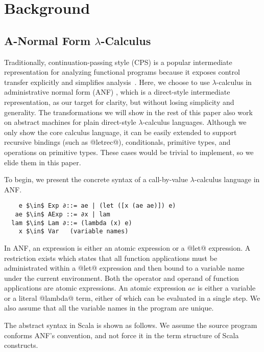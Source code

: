 \documentclass[acmsmall,review,anonymous]{acmart}\settopmatter{printfolios=true,printccs=false,printacmref=false}
\begin{document}
\section{Background} \label{background}

\subsection{A-Normal Form $\lambda$-Calculus} \label{anfsyntax}

Traditionally, continuation-passing style (CPS) is a popular intermediate representation
for analyzing functional programs because it exposes control transfer explicitly
and simplifies analysis~\cite{Shivers:1991:SSC:115865.115884, Shivers:1988:CFA:53990.54007}.
Here, we choose to use $\lambda$-calculus in administrative normal form (ANF) \cite{flanagan1993essence},
which is a direct-style intermediate representation, as our target for clarity,
but without losing simplicity and generality.
The transformations we will show in the rest of this paper
also work on abstract machines for plain direct-style $\lambda$-calculus languages.
Although we only show the core calculus language, it can be easily extended
to support recursive bindings (such as @letrec@), conditionals, primitive types, and
operations on primitive types. These cases would be trivial to implement,
so we elide them in this paper.

To begin, we present the concrete syntax of a call-by-value $\lambda$-calculus language
in ANF.

\begin{lstlisting}
    e $\in$ Exp ∂::= ae | (let ([x (ae ae)]) e)
   ae $\in$ AExp ::= ∂x | lam
  lam $\in$ Lam ∂::= (lambda (x) e)
    x $\in$ Var   (variable names)
\end{lstlisting}

In ANF, an expression is either an atomic expression or a @let@ expression.
A restriction exists which states that all function applications must be administrated
within a @let@ expression and then bound to a variable name under the current environment.
Both the operator and operand of function applications are atomic expressions.
An atomic expression $ae$ is either a variable or a literal @lambda@ term, either of which
can be evaluated in a single step.
We also assume that all the variable names in the program are unique.

The abstract syntax in Scala is shown as follows. We assume the source 
program conforms ANF's convention, and not force it in the term structure 
of Scala constructs.
\end{document}
